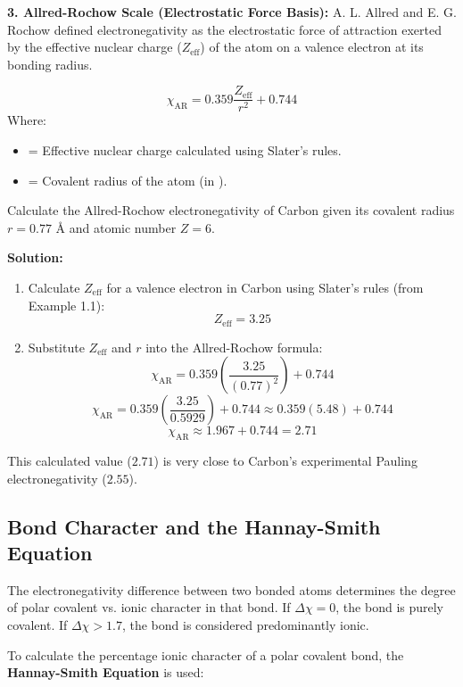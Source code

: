 \documentclass[12pt,a4paper]{article}
\begin{document}
\textbf{3. Allred-Rochow Scale (Electrostatic Force Basis):}
A. L. Allred and E. G. Rochow defined electronegativity as the electrostatic force of attraction exerted by the effective nuclear charge ($Z_{\text{eff}}$) of the atom on a valence electron at its bonding radius.
\begin{tcolorbox}[formulabox, title={Allred-Rochow Electronegativity Equation}]
  \[ \chi_{\text{AR}} = 0.359 \frac{Z_{\text{eff}}}{r^2} + 0.744 \]
  Where:
  \begin{itemize}[leftmargin=1.5cm, itemsep=1pt]
    \item[$Z_{\text{eff}}$] = Effective nuclear charge calculated using Slater's rules.
    \item[$r$] = Covalent radius of the atom (in \text{\AA}).
  \end{itemize}
\end{tcolorbox}

\begin{tcolorbox}[examplebox, title={Example 5.1: Calculation of Allred-Rochow Electronegativity for Carbon}]
  Calculate the Allred-Rochow electronegativity of Carbon given its covalent radius $r = 0.77\text{ \AA}$ and atomic number $Z = 6$.
  \par\vspace{4pt}
  \textbf{Solution:}
  \begin{enumerate}
    \item Calculate $Z_{\text{eff}}$ for a valence electron in Carbon using Slater's rules (from Example 1.1):
      \[ Z_{\text{eff}} = 3.25 \]
    \item Substitute $Z_{\text{eff}}$ and $r$ into the Allred-Rochow formula:
      \[ \chi_{\text{AR}} = 0.359 \left( \frac{3.25}{(0.77)^2} \right) + 0.744 \]
      \[ \chi_{\text{AR}} = 0.359 \left( \frac{3.25}{0.5929} \right) + 0.744 \approx 0.359 (5.48) + 0.744 \]
      \[ \chi_{\text{AR}} \approx 1.967 + 0.744 = 2.71 \]
  \end{enumerate}
  This calculated value ($2.71$) is very close to Carbon's experimental Pauling electronegativity ($2.55$).
\end{tcolorbox}

\subsection{Bond Character and the Hannay-Smith Equation}
The electronegativity difference between two bonded atoms determines the degree of polar covalent vs. ionic character in that bond. If $\Delta\chi = 0$, the bond is purely covalent. If $\Delta\chi > 1.7$, the bond is considered predominantly ionic.
\par
To calculate the percentage ionic character of a polar covalent bond, the \textbf{Hannay-Smith Equation} is used:
\end{document}

